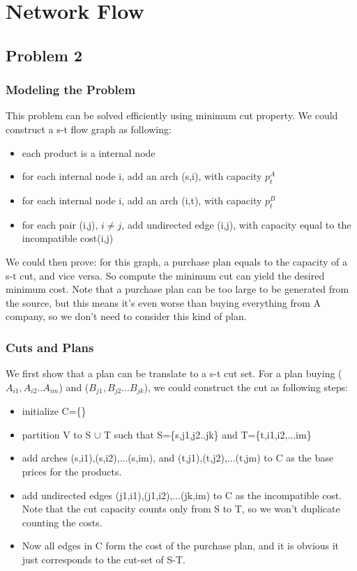 \documentclass[paper=a4, fontsize=11pt]{scrartcl} %
\numberwithin{equation}{section} %
\numberwithin{figure}{section} %
\numberwithin{table}{section} %
\begin{document}
\section*{Network Flow}
\subsection*{Problem 2}
\subsubsection*{\textbf{Modeling the Problem}} This problem can be solved efficiently using minimum
cut property. We could construct a s-t flow graph as following:
\begin{itemize}
  \item each product is a internal node
  \item for each internal node i, add an arch (s,i), with capacity $p^A_t$
  \item for each internal node i, add an arch (i,t), with capacity $p^B_t$
  \item for each pair (i,j), $i \ne j$, add undirected edge (i,j), with
  capacity equal to the incompatible cost(i,j)
\end{itemize}
We could then prove: for this graph, a purchase plan equals to the capacity of
a s-t cut, and vice versa. So compute the minimum cut can yield the desired
minimum cost. Note that a purchase plan can be too large to be generated from
the source, but this means it's even worse than buying everything from A
company, so we don't need to consider this kind of plan.

\subsubsection*{\textbf{Cuts and Plans}} 
We first show that a plan can be translate to a s-t cut set. For a plan
buying ($A_{i1},A_{i2}..A_{im}$) and ($B_{j1},B_{j2}...B_{jk}$), we could
construct the cut as following steps:
\begin{itemize}
\item initialize C=\{\}
\item partition V to S $\cup$ T such that S=\{s,j1,j2..jk\} and T=\{t,i1,i2,...im\}
\item add arches (s,i1),(s,i2),...(s,im), and (t,j1),(t,j2),...(t,jm) to C as
the base prices for the products.
\item add undirected edges (j1,i1),(j1,i2),...(jk,im) to C as the incompatible
cost. Note that the cut capacity counts only from S to T, so we won't duplicate
counting the costs.
\item Now all edges in C form the cost of the purchase plan, and it is obvious
it just corresponds to the cut-set of S-T.
\end{itemize}
\end{document}
